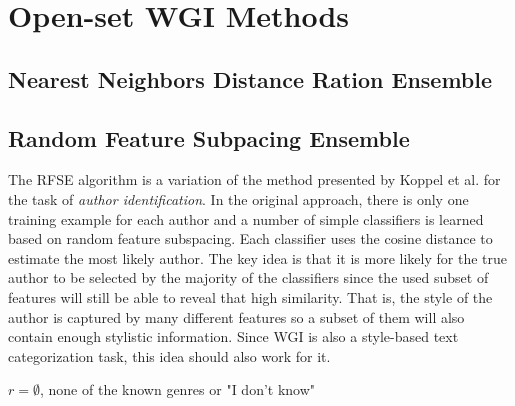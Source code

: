 \documentclass[runningheads]{llncs}
\begin{document}
\section{Open-set WGI Methods}\label{sec:Ensembles_Description}

\subsection{Nearest Neighbors Distance Ration Ensemble}\label{sec:NNRD_Description}



\subsection{Random Feature Subpacing Ensemble}\label{sec:RFSE_Description}

The RFSE algorithm is a variation of the method presented by Koppel et al. \citep{koppel2011authorship} for the task of \textit{author identification}. In the original approach, there is only one training example for each author and a number of simple classifiers is learned based on random feature subspacing. Each classifier uses the cosine distance to estimate the most likely author. The key idea is that it is more likely for the true author to be selected by the majority of the classifiers since the used subset of features will still be able to reveal that high similarity. That is, the style of the author is captured by many different features so a subset of them will also contain enough stylistic information. Since WGI is also a style-based text categorization task, this idea should also work for it.

\hfill \break

\begin{algorithm}[H]
\caption{The \textit{RFSE} algorithm.}\label{alg:RFS-Ensemble}

{
      $r = \emptyset$, none of the known genres or "I don't know"\;
}
\end{algorithm}
\end{document}
